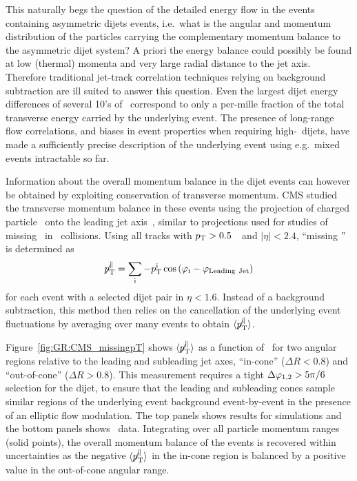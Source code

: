 This naturally begs the question of the detailed energy flow in the events containing asymmetric
dijets events, i.e.\ what is the angular and momentum distribution of the particles carrying
the complementary momentum balance to the asymmetric dijet system? A priori the energy balance
could possibly be found at low (thermal) momenta and very large radial distance to the jet axis.
Therefore traditional jet-track correlation techniques relying on background subtraction are ill suited
to answer this question. Even the largest dijet energy differences of several 10's of \GeV\
correspond to only a per-mille fraction of the total transverse energy carried by the underlying 
event. The presence of long-range flow correlations, and biases in event properties when requiring 
high-\pT\ dijets, have made a sufficiently precise description of the underlying event using e.g.\ 
mixed events intractable so far.

Information about the overall momentum balance in the dijet events can however be obtained by exploiting
conservation of transverse momentum. CMS studied the transverse momentum balance in these events
using the projection of charged particle \pT\ onto the leading 
jet axis~\cite{Chatrchyan:2011sx}, similar to projections used for studies of missing \pT\ in \pp\
collisions.  Using all tracks with $\mbox{$p_{\mathrm{T}}$} > 0.5$~\GeVc\ and $|\eta| < 2.4$, 
``missing \pT'' is determined as 
\begin{equation}
\displaystyle{\not} p_{\mathrm{T}}^{\parallel} =
\sum_{\rm i}{ -p_{\mathrm{T}}^{\rm i}\cos{(\varphi_{\rm i}-\varphi_{\rm Leading\ Jet})}}
\end{equation}
for each event with a selected dijet pair in $\eta < 1.6$.
Instead of a background subtraction, this method then relies on the cancellation of the
underlying event fluctuations by averaging over many events to obtain
$\langle \displaystyle{\not} p_{\mathrm{T}}^{\parallel} \rangle$.

Figure~\ref{fig:GR:CMS_missingpT} shows $\langle \displaystyle{\not} p_{\mathrm{T}}^{\parallel} \rangle$
as a function of \AJ\ for two angular regions relative to the leading and subleading
jet axes, ``in-cone'' ($\Delta R < 0.8$) and ``out-of-cone'' ($\Delta R > 0.8$).
This measurement requires a tight $\Delta\varphi_{1,2} > 5 \pi/6$ selection for the dijet, to ensure that the 
leading and subleading cones sample similar regions of the underlying event background 
event-by-event in the presence of an elliptic flow modulation.
The top panels shows results for  {\sc{pythia+hydjet}} simulations and the bottom panels shows
\PbPb\ data. Integrating over all particle momentum ranges (solid points),
 the overall momentum balance of the events is recovered within uncertainties
as the negative $\langle \displaystyle{\not} p_{\mathrm{T}}^{\parallel} \rangle$ in
the in-cone region is balanced by a positive value in the out-of-cone angular range.

